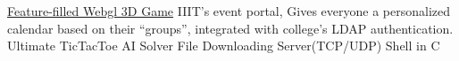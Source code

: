 \documentclass[]{deedy-resume-openfont}
\begin{document}
\begin{minipage}[t]{0.66\textwidth}



 \textbullet
\href{https://mukulhase.com/ThreeJSCarrom/}{\underline{Feature-filled Webgl 3D Game}} \textbullet  IIIT’s event portal, Gives everyone a personalized calendar based on their “groups”, integrated with college’s LDAP authentication. \textbullet Ultimate\textbf{} TicTacToe AI Solver \textbullet File Downloading Server(TCP/UDP) \textbullet Shell in C

\sectionsep


\end{minipage} 
\end{document}
